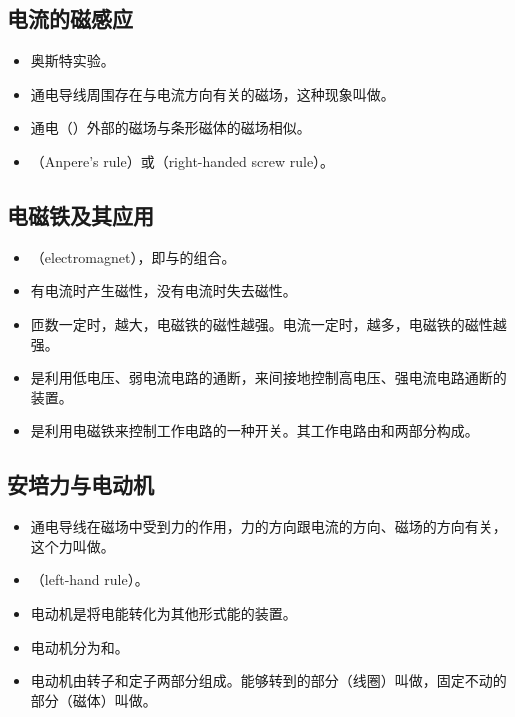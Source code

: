 \subsection{电流的磁感应}
\begin{itemize}
\item 奥斯特实验。
\item 通电导线周围存在与电流方向有关的磁场，这种现象叫做。
\item 通电（）外部的磁场与条形磁体的磁场相似。
\item {}（Anpere's rule）或（right-handed screw rule）。
\end{itemize}

\subsection{电磁铁及其应用}
\begin{itemize}
\item {}（electromagnet），即与的组合。
\item 有电流时产生磁性，没有电流时失去磁性。
\item 匝数一定时，越大，电磁铁的磁性越强。电流一定时，越多，电磁铁的磁性越强。
\item {}是利用低电压、弱电流电路的通断，来间接地控制高电压、强电流电路通断的装置。
\item {}是利用电磁铁来控制工作电路的一种开关。其工作电路由和两部分构成。
\end{itemize}

\subsection{安培力与电动机}
\begin{itemize}
\item 通电导线在磁场中受到力的作用，力的方向跟电流的方向、磁场的方向有关，这个力叫做。
\item {}（left-hand rule）。
\item 电动机是将电能转化为其他形式能的装置。
\item 电动机分为和。
\item 电动机由转子和定子两部分组成。能够转到的部分（线圈）叫做，固定不动的部分（磁体）叫做。
\end{itemize}

